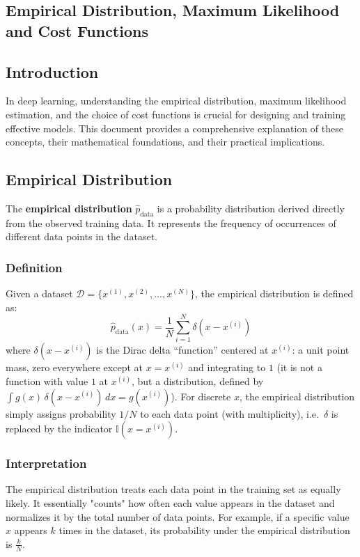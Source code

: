 \begin{notechapter}
\chapter{Empirical Distribution, Maximum Likelihood and Cost Functions}\label{ch:dl-cost-functions}

\section{Introduction}
In deep learning, understanding the empirical distribution, maximum likelihood estimation, and the choice of cost functions is crucial for designing and training effective models. This document provides a comprehensive explanation of these concepts, their mathematical foundations, and their practical implications.

\section{Empirical Distribution}
The \textbf{empirical distribution} \( \hat{p}_{\text{data}} \) is a probability distribution derived directly from the observed training data. It represents the frequency of occurrences of different data points in the dataset.

\subsection{Definition}
Given a dataset \( \mathcal{D} = \{x^{(1)}, x^{(2)}, \dots, x^{(N)}\} \), the empirical distribution is defined as:
\[
\hat{p}_{\text{data}}(x) = \frac{1}{N} \sum_{i=1}^N \delta(x - x^{(i)})
\]
where \( \delta(x - x^{(i)}) \) is the Dirac delta ``function'' centered at \( x^{(i)} \): a unit point mass, zero everywhere except at \( x = x^{(i)} \) and integrating to \( 1 \) (it is not a function with value \( 1 \) at \( x^{(i)} \), but a distribution, defined by \( \int g(x)\,\delta(x - x^{(i)})\,dx = g(x^{(i)}) \)). For discrete \( x \), the empirical distribution simply assigns probability \( 1/N \) to each data point (with multiplicity), i.e.\ \( \delta \) is replaced by the indicator \( \mathbb{I}(x = x^{(i)}) \).

\subsection{Interpretation}
The empirical distribution treats each data point in the training set as equally likely. It essentially "counts" how often each value appears in the dataset and normalizes it by the total number of data points. For example, if a specific value \( x \) appears \( k \) times in the dataset, its probability under the empirical distribution is \( \frac{k}{N} \).


\end{notechapter}
